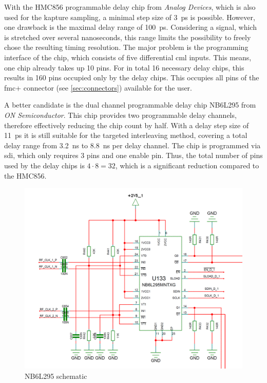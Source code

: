 With the HMC856 programmable delay chip from \textit{Analog Devices}, which is also used for the \gls{kapture} sampling, a minimal step size of \SI{3}{\pico\second} \cite{hmc856} is possible.
However, one drawback is the maximal delay range of \SI{100}{\pico\second}.
Considering a signal, which is stretched over several nanoseconds, this range limits the possibility to freely chose the resulting timing resolution.
The major problem is the programming interface of the chip, which consists of five differential \gls{cml} inputs.
This means, one chip already takes up 10 pins.
For in total 16 necessary delay chips, this results in 160 pins occupied only by the delay chips.
This occupies all pins of the \gls{fmc}+ connector (see \autoref{sec:connectors}) available for the user. 

A better candidate is the dual channel programmable delay chip NB6L295 from \textit{ON Semiconductor}.
This chip provides two programmable delay channels, therefore effectively reducing the chip count by half.
With a delay step size of \SI{11}{\pico\second} it is still suitable for the targeted interleaving method, covering a total delay range from \SI{3.2}{\nano\second} to \SI{8.8}{\nano\second} per delay channel.
The chip is programmed via \gls{sdi}, which only requires 3 pins and one enable pin. %
Thus, the total number of pins used by the delay chips is $4\cdot8 = 32$, which is a significant reduction compared to the HMC856. %

\begin{figure}[tbh]
	\centering
	\includegraphics[width = \textwidth]{chap/04-work/img/delay_chip}
	\caption[NB6L295 delay chip schematic]{NB6L295 schematic}
	\label{fig:nb6l295}
\end{figure}

